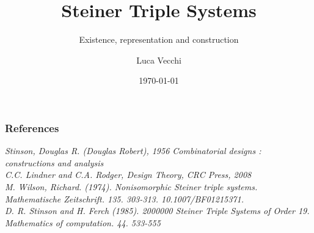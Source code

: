 \documentclass{beamer}
\title{Steiner Triple Systems}
\subtitle{Existence, representation and construction}
\author{Luca Vecchi}
\institute{Università di Milano}
\date{\today}
\begin{document}
	\begin{frame}
	\titlepage
	\end{frame}
	
	
	
	
	
	
	
	
	
	
	


	\begin{frame}
	\frametitle{References}
	
	\textit{Stinson, Douglas R. (Douglas Robert), 1956 	Combinatorial designs : constructions and analysis}\\
	\textit{C.C. Lindner and C.A. Rodger, Design Theory, CRC Press, 2008}\\
	\textit{M. Wilson, Richard. (1974). Nonisomorphic Steiner triple systems. Mathematische Zeitschrift. 135. 303-313. 10.1007/BF01215371. }\\
	\textit{D. R. Stinson and H. Ferch (1985). 2000000 Steiner Triple Systems of Order 19. Mathematics of computation. 44. 533-555}
	\end{frame}
\end{document}
